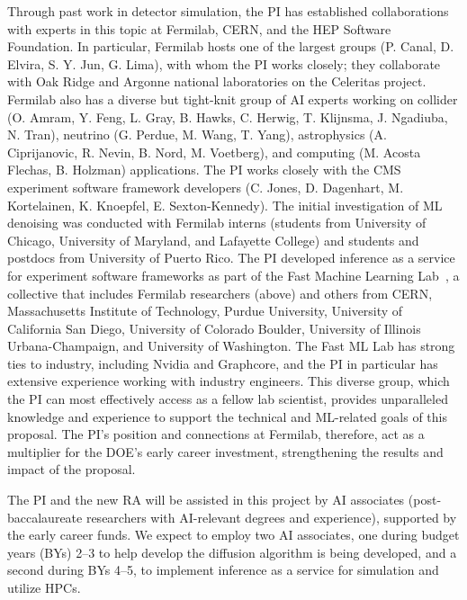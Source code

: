Through past work in detector simulation, the PI has established collaborations with experts in this topic at Fermilab, CERN, and the HEP Software Foundation.
In particular, Fermilab hosts one of the largest \GEANTfour groups (P. Canal, D. Elvira, S. Y. Jun, G. Lima), with whom the PI works closely;
they collaborate with Oak Ridge and Argonne national laboratories on the Celeritas project.
Fermilab also has a diverse but tight-knit group of AI experts working on collider (O. Amram, Y. Feng, L. Gray, B. Hawks, C. Herwig, T. Klijnsma, J. Ngadiuba, N. Tran),
neutrino (G. Perdue, M. Wang, T. Yang), astrophysics (A. Ciprijanovic, R. Nevin, B. Nord, M. Voetberg), and computing (M. Acosta Flechas, B. Holzman) applications.
The PI works closely with the CMS experiment software framework developers (C. Jones, D. Dagenhart, M. Kortelainen, K. Knoepfel, E. Sexton-Kennedy).
The initial investigation of ML denoising was conducted with Fermilab interns (students from University of Chicago, University of Maryland, and Lafayette College) and students and postdocs from University of Puerto Rico.
The PI developed inference as a service for experiment software frameworks as part of the Fast Machine Learning Lab~\cite{FML},
a collective that includes Fermilab researchers (above)
and others from CERN, Massachusetts Institute of Technology, Purdue University, University of California San Diego, University of Colorado Boulder, University of Illinois Urbana-Champaign, and University of Washington.
The Fast ML Lab has strong ties to industry, including Nvidia and Graphcore, and the PI in particular has extensive experience working with industry engineers.
This diverse group, which the PI can most effectively access as a fellow lab scientist,
provides unparalleled knowledge and experience to support the technical and ML-related goals of this proposal.
The PI's position and connections at Fermilab, therefore, act as a multiplier for the DOE's early career investment, strengthening the results and impact of the proposal.

The PI and the new RA will be assisted in this project by AI associates (post-baccalaureate researchers with AI-relevant degrees and experience), supported by the early career funds.
We expect to employ two AI associates, one during budget years (BYs) 2--3 to help develop the diffusion algorithm is being developed, and a second during BYs 4--5, to implement inference as a service for simulation and utilize HPCs.